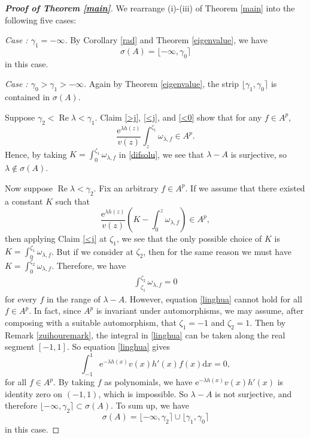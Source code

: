 \documentclass[10pt,a4paper]{amsart}
\begin{document}
\begin{proof}[\textbf{Proof of Theorem \ref{main}}]
We rearrange (i)-(iii) of Theorem \ref{main} into the following five cases:

\noindent\emph{ Case \uppercase\expandafter{}: $\gamma_1=-\infty$.} By Corollary \ref{rad} and Theorem \ref{eigenvalue}, we have
$$\sigma(A)=\lfloor-\infty, \gamma_0\rceil$$
in this case.



\noindent\emph{ Case \uppercase\expandafter{}: $\gamma_0>\gamma_1>-\infty$.} Again by Theorem \ref{eigenvalue}, the strip $\lfloor\gamma_1, \gamma_0\rceil$ is contained in $\sigma(A).$

Suppose $\gamma_2<\operatorname{Re}\lambda<\gamma_1$. Claim \ref{>j}, \ref{<j}, and \ref{<0} show that for any $f\in A^p$,
$$\frac{ \mathrm{e}^{\lambda h(z)}}{v(z)}\int_z^{\zeta_1} \omega_{\lambda,f}\in A^p.$$
Hence, by taking $K=\int_0^{\zeta_1} \omega_{\lambda,f}$ in \eqref{difsolu}, we see that $\lambda-A$ is surjective, so $\lambda\notin\sigma(A)$.

Now suppose $\operatorname{Re}\lambda<\gamma_2$. Fix an arbitrary $f\in A^p$. If we assume that there existed a constant $K$ such that
$$\frac{ \mathrm{e}^{\lambda h(z)}}{v(z)}\left(K-\int_0^z \omega_{\lambda,f}\right)\in A^p,$$
then applying Claim \ref{<j} at $\zeta_1$, we see that the only possible choice of $K$ is $K=\int_0^{\zeta_1} \omega_{\lambda,f}$. But if we consider at  $\zeta_2$, then for the same reason we must have $K=\int_0^{\zeta_2} \omega_{\lambda,f}.$ Therefore, we have 
\begin{align}\label{linghua}
\int_{\zeta_1}^{\zeta_2} \omega_{\lambda,f}=0
\end{align}
for every $f$ in the range of $\lambda-A$. However, equation \eqref{linghua} cannot hold for all $f\in A^p$. In fact,  since $A^p$ is invariant under automorphisms, we may assume, after composing with a suitable automorphism, that $\zeta_1=-1$ and $\zeta_2=1$. Then by Remark \ref{zuihouremark}, the integral in \eqref{linghua} can be taken along the real segment $[-1,1]$. So equation \eqref{linghua} gives
$$\int_{-1}^{1} \mathrm{e}^{-\lambda h(x)}v(x)h'(x)f(x)\mathrm{d}x=0,$$
for all $f\in A^p$. By taking $f$ as polynomials, we have $\mathrm{e}^{-\lambda h(x)}v(x)h'(x)$ is identity zero on $(-1,1)$, which is  impossible. So $\lambda-A$ is not surjective, and therefore $\lfloor-\infty, \gamma_2\rceil\subset\sigma(A)$. To sum up, we have 
$$\sigma(A)=\lfloor-\infty, \gamma_2\rceil\cup\lfloor\gamma_1, \gamma_0\rceil$$
in this case.








\end{proof}
\end{document}
